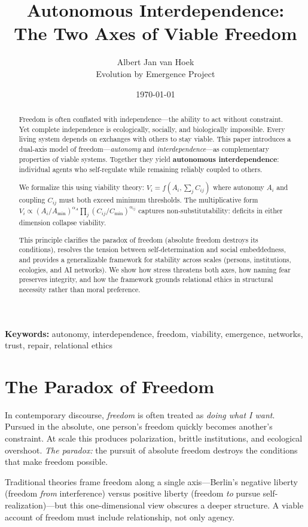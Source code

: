 \documentclass[11pt,a4paper]{article}
\title{\textbf{Autonomous Interdependence:\\The Two Axes of Viable Freedom}}
\author{Albert Jan van Hoek \\ \small Evolution by Emergence Project}
\date{\today}
\begin{document}
\maketitle

\begin{abstract}
Freedom is often conflated with independence---the ability to act without constraint.
Yet complete independence is ecologically, socially, and biologically impossible.
Every living system depends on exchanges with others to stay viable.
This paper introduces a dual-axis model of freedom---\emph{autonomy} and \emph{interdependence}---as complementary properties of viable systems.
Together they yield \textbf{autonomous interdependence}: individual agents who self-regulate while remaining reliably coupled to others.

We formalize this using viability theory: $V_i = f(A_i, \sum_j C_{ij})$ where autonomy $A_i$ and coupling $C_{ij}$ must both exceed minimum thresholds. The multiplicative form $V_i \propto (A_i/A_{\min})^{\alpha_A} \prod_j (C_{ij}/C_{\min})^{\alpha_{ij}}$ captures non-substitutability: deficits in either dimension collapse viability.

This principle clarifies the paradox of freedom (absolute freedom destroys its conditions), resolves the tension between self-determination and social embeddedness, and provides a generalizable framework for stability across scales (persons, institutions, ecologies, and AI networks). We show how stress threatens both axes, how naming fear preserves integrity, and how the framework grounds relational ethics in structural necessity rather than moral preference.
\end{abstract}

\noindent\textbf{Keywords:} autonomy, interdependence, freedom, viability, emergence, networks, trust, repair, relational ethics

\section{The Paradox of Freedom}

In contemporary discourse, \emph{freedom} is often treated as \emph{doing what I want}.
Pursued in the absolute, one person's freedom quickly becomes another's constraint.
At scale this produces polarization, brittle institutions, and ecological overshoot.
\emph{The paradox:} the pursuit of absolute freedom destroys the conditions that make freedom possible.

Traditional theories frame freedom along a single axis---Berlin's negative liberty (freedom \emph{from} interference) versus positive liberty (freedom \emph{to} pursue self-realization)---but this one-dimensional view obscures a deeper structure. A viable account of freedom must include relationship, not only agency.
\end{document}
